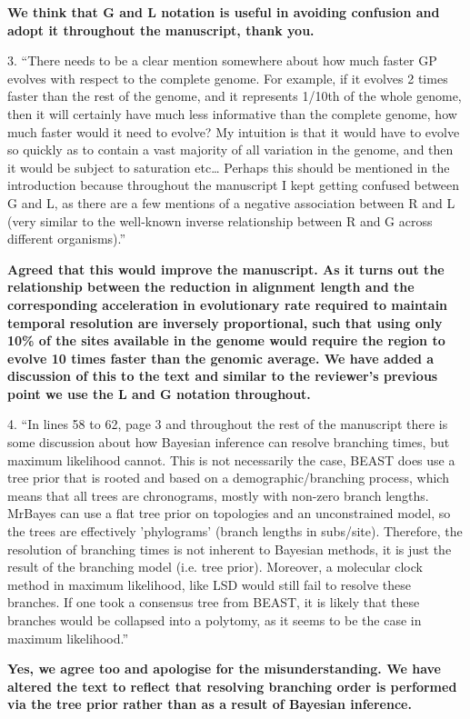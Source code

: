 \documentclass[11pt,oneside,letterpaper]{article}
\begin{document}
\textbf{We think that G and L notation is useful in avoiding confusion and adopt it throughout the manuscript, thank you.}

3. ``There needs to be a clear mention somewhere about how much faster GP evolves with respect to the complete genome. For example, if it evolves 2 times faster than the rest of the genome, and it represents 1/10th of the whole genome, then it will certainly have much less informative than the complete genome, how much faster would it need to evolve? My intuition is that it would have to evolve so quickly as to contain a vast majority of all variation in the genome, and then it would be subject to saturation etc… Perhaps this should be mentioned in the introduction because throughout the manuscript I kept getting confused between G and L, as there are a few mentions of a negative association between R and L (very similar to the well-known inverse relationship between R and G across different organisms).''

\textbf{Agreed that this would improve the manuscript. As it turns out the relationship between the reduction in alignment length and the corresponding acceleration in evolutionary rate required to maintain temporal resolution are inversely proportional, such that using only 10\% of the sites available in the genome would require the region to evolve 10 times faster than the genomic average. We have added a discussion of this to the text and similar to the reviewer's previous point we use the L and G notation throughout.}

4. ``In lines 58 to 62, page 3 and throughout the rest of the manuscript there is some discussion about how Bayesian inference can resolve branching times, but maximum likelihood cannot. This is not necessarily the case, BEAST does use a tree prior that is rooted and based on a demographic/branching process, which means that all trees are chronograms, mostly with non-zero branch lengths. MrBayes can use a flat tree prior on topologies and an unconstrained model, so the trees are effectively 'phylograms' (branch lengths in subs/site). Therefore, the resolution of branching times is not inherent to Bayesian methods, it is just the result of the branching model (i.e. tree prior). Moreover, a molecular clock method in maximum likelihood, like LSD would still fail to resolve these branches. If one took a consensus tree from BEAST, it is likely that these branches would be collapsed into a polytomy, as it seems to be the case in maximum likelihood.''

\textbf{Yes, we agree too and apologise for the misunderstanding. We have altered the text to reflect that resolving branching order is performed via the tree prior rather than as a result of Bayesian inference.}
\end{document}

